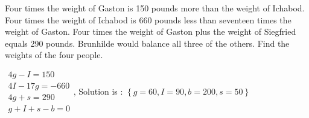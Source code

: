 \begin{enumialphparenastyle}
\begin{ex}
Four times the weight of Gaston is 150 pounds more than the weight of
Ichabod. Four times the weight of Ichabod is 660 pounds less than seventeen
times the weight of Gaston. Four times the weight of Gaston plus the weight
of Siegfried equals 290 pounds. Brunhilde would balance all three of the
others. Find the weights of the four people.
\begin{sol}
$\begin{array}{c}
4g-I=150 \\
4I-17g=-660 \\
4g+s=290 \\
g+I+s-b=0
\end{array}
$, Solution is : $\left\{ g=60,I=90,b=200,s=50\right\} $
\end{sol}
\end{ex}

\end{enumialphparenastyle}